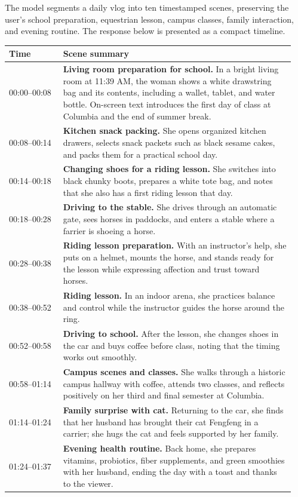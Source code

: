 \documentclass{llmxive}
\providecommand{\arraystretch}{1.15}
\begin{document}
\begin{caseresponse}
The model segments a daily vlog into ten timestamped scenes, preserving the user's school preparation, equestrian lesson, campus classes, family interaction, and evening routine. The response below is presented as a compact timeline.

\renewcommand{\arraystretch}{1.08}
\begin{tabular}{p{0.18\linewidth}p{0.77\linewidth}}
\toprule
\textbf{Time} & \textbf{Scene summary} \\
\midrule
00:00--00:08 & \textbf{Living room preparation for school.} In a bright living room at 11:39 AM, the woman shows a white drawstring bag and its contents, including a wallet, tablet, and water bottle. On-screen text introduces the first day of class at Columbia and the end of summer break. \\
00:08--00:14 & \textbf{Kitchen snack packing.} She opens organized kitchen drawers, selects snack packets such as black sesame cakes, and packs them for a practical school day. \\
00:14--00:18 & \textbf{Changing shoes for a riding lesson.} She switches into black chunky boots, prepares a white tote bag, and notes that she also has a first riding lesson that day. \\
00:18--00:28 & \textbf{Driving to the stable.} She drives through an automatic gate, sees horses in paddocks, and enters a stable where a farrier is shoeing a horse. \\
00:28--00:38 & \textbf{Riding lesson preparation.} With an instructor's help, she puts on a helmet, mounts the horse, and stands ready for the lesson while expressing affection and trust toward horses. \\
00:38--00:52 & \textbf{Riding lesson.} In an indoor arena, she practices balance and control while the instructor guides the horse around the ring. \\
00:52--00:58 & \textbf{Driving to school.} After the lesson, she changes shoes in the car and buys coffee before class, noting that the timing works out smoothly. \\
00:58--01:14 & \textbf{Campus scenes and classes.} She walks through a historic campus hallway with coffee, attends two classes, and reflects positively on her third and final semester at Columbia. \\
01:14--01:24 & \textbf{Family surprise with cat.} Returning to the car, she finds that her husband has brought their cat Fengfeng in a carrier; she hugs the cat and feels supported by her family. \\
01:24--01:37 & \textbf{Evening health routine.} Back home, she prepares vitamins, probiotics, fiber supplements, and green smoothies with her husband, ending the day with a toast and thanks to the viewer. \\
\bottomrule
\end{tabular}
\renewcommand{\arraystretch}{1}
\end{caseresponse}
\end{document}

